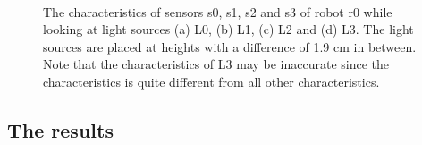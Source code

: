 \begin{figure}[t]
\centering
{}
\\
\caption{The characteristics of sensors s0, s1, s2 and s3 of robot r0 while looking at light sources (a) L0, (b) L1, (c) L2 and (d) L3. The light sources are placed at heights with a difference of 1.9 cm in between. Note that the characteristics of L3 may be inaccurate since the characteristics is quite different from all other characteristics.}
\label{f:int:calibration}
\end{figure}

\subsection{The results}


